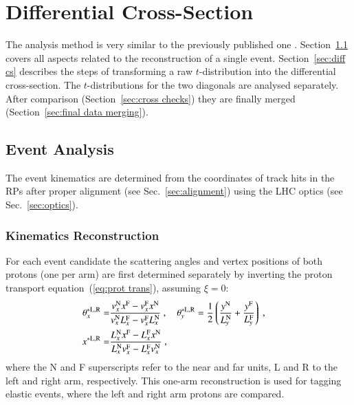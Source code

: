 \section{Differential Cross-Section}
\label{sec:differential cross-section}

The analysis method is very similar to the previously published one \cite{8tev-90m}. Section~\ref{sec:event analysis} covers all aspects related to the reconstruction of a single event. Section~\ref{sec:diff cs} describes the steps of transforming a raw $t$-distribution into the differential cross-section. The $t$-distributions for the two diagonals are analysed separately. After comparison (Section~\ref{sec:cross checks}) they are finally merged (Section~\ref{sec:final data merging}).

\subsection{Event Analysis}
\label{sec:event analysis}

The event kinematics are determined from the coordinates of track hits in the RPs after proper alignment (see Sec.~\ref{sec:alignment}) using the LHC optics (see Sec.~\ref{sec:optics}).


\subsubsection{Kinematics Reconstruction}
\label{sec:kinematics}

For each event candidate 
the scattering angles and vertex positions of both protons (one per arm) are first determined separately by inverting the proton transport equation~(\ref{eq:prot trans}), assuming $\xi = 0$:
\begin{equation}
\label{eq:kin 1a}
	\begin{aligned}
		\theta_x^{*\rm L,R} =& {v_x^{\rm N} x^{\rm F} - v_x^{\rm F} x^{\rm N}\over v_x^{\rm N} L_x^{\rm F} - v_x^{\rm F} L_x^{\rm N}}\ ,\quad
			\theta_y^{*\rm L,R} = {1\over 2} \left( {y^{\rm N}\over L_y^{\rm N}} + {y^{\rm F}\over L_y^{\rm F}} \right)\ ,\cr
		x^{*\rm L,R} =& {L_x^{\rm N} x^{\rm F} - L_x^{\rm F} x^{\rm N}\over L_x^{\rm N} v_x^{\rm F} - L_x^{\rm F} v_x^{\rm N}}\ ,\cr
	\end{aligned}
\end{equation}
where the N and F superscripts refer to the near and far units, L and R to the left and right arm, respectively. 
This one-arm reconstruction is used for tagging elastic events, where the left and right arm protons are compared.

